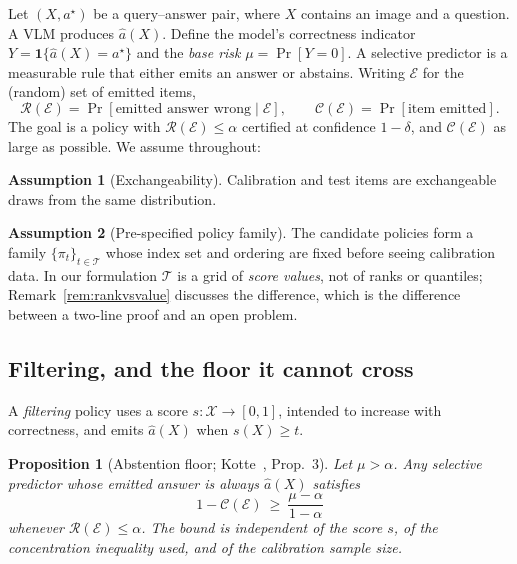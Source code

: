 \documentclass[review,number,doubleblind]{elsarticle}
\theoremstyle{plain}
\newtheorem{proposition}{Proposition}
\theoremstyle{definition}
\newtheorem{assumption}{Assumption}
\theoremstyle{remark}
\newcommand{\Risk}{\mathcal{R}}
\newcommand{\Cov}{\mathcal{C}}
\newcommand{\emit}{\mathcal{E}}
\begin{document}
Let $(X,a^\star)$ be a query--answer pair, where $X$ contains an image and a question. A
VLM produces $\hat a(X)$. Define the model's correctness indicator
$Y=\mathbf{1}\{\hat a(X)=a^\star\}$ and the \emph{base risk} $\mu=\Pr[Y=0]$. A selective
predictor is a measurable rule that either emits an answer or abstains. Writing $\emit$ for
the (random) set of emitted items,
\[
\Risk(\emit)=\Pr[\text{emitted answer wrong}\mid \emit],\qquad
\Cov(\emit)=\Pr[\text{item emitted}].
\]
The goal is a policy with $\Risk(\emit)\le\alpha$ certified at confidence $1-\delta$, and
$\Cov(\emit)$ as large as possible. We assume throughout:

\begin{assumption}[Exchangeability]
\label{ass:exch}
Calibration and test items are exchangeable draws from the same distribution.
\end{assumption}

\begin{assumption}[Pre-specified policy family]
\label{ass:family}
The candidate policies form a family $\{\pi_t\}_{t\in\mathcal{T}}$ whose index set and
ordering are fixed before seeing calibration data. In our formulation $\mathcal{T}$ is a grid
of \emph{score values}, not of ranks or quantiles; Remark~\ref{rem:rankvsvalue} discusses the
difference, which is the difference between a two-line proof and an open problem.
\end{assumption}

\subsection{Filtering, and the floor it cannot cross}

A \emph{filtering} policy uses a score $s:\mathcal{X}\to[0,1]$, intended to increase with
correctness, and emits $\hat a(X)$ when $s(X)\ge t$.

\begin{proposition}[Abstention floor; Kotte~\cite{crcimposs}, Prop.~3]
\label{prop:floor}
Let $\mu>\alpha$. Any selective predictor whose emitted answer is always $\hat a(X)$
satisfies
\[
1-\Cov(\emit)\ \ge\ \frac{\mu-\alpha}{1-\alpha}
\]
whenever $\Risk(\emit)\le\alpha$. The bound is independent of the score $s$, of the
concentration inequality used, and of the calibration sample size.
\end{proposition}
\end{document}
